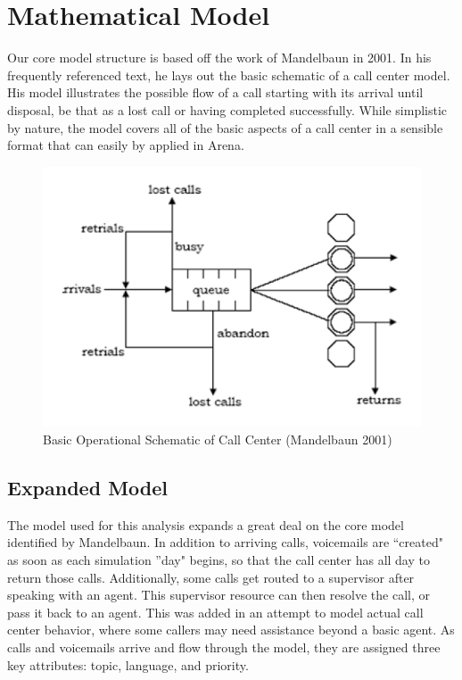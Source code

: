 \documentclass[12pt,twocolumn]{article}
\begin{document}
\section{Mathematical Model}

Our core model structure is based off the work of Mandelbaun in 2001.  In his frequently referenced text, he lays out the basic schematic of a call center model.  His model illustrates the possible flow of a call starting with its arrival until disposal, be that as a lost call or having completed successfully.\cite{mandelbaun}  While simplistic by nature, the model covers all of the basic aspects of a call center in a sensible format that can easily by applied in Arena.  

	\begin{figure}[h]
	\includegraphics[scale=.45]{call_center_layout.png}
	\caption{Basic Operational Schematic of Call Center (Mandelbaun 2001)}
	\end{figure}


\subsection{Expanded Model}

The model used for this analysis expands a great deal on the core model identified by Mandelbaun.  In addition to arriving calls, voicemails are ``created" as soon as each simulation ''day" begins, so that the call center has all day to return those calls.  Additionally, some calls get routed to a supervisor after speaking with an agent.  This supervisor resource can then resolve the call, or pass it back to an agent.  This was added in an attempt to model actual call center behavior, where some callers may need assistance beyond a basic agent.  As calls and voicemails arrive and flow through the model, they are assigned three key attributes: topic, language, and priority.
\end{document}
